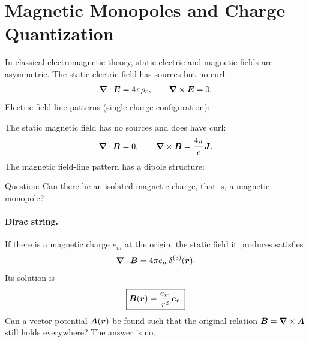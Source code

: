 \section{Magnetic Monopoles and Charge Quantization}
In classical electromagnetic theory, static electric and magnetic fields are asymmetric. The static electric field has sources but no curl:
\begin{equation}
\bm{\nabla}\cdot\bm{E}=4\pi\rho_e,\qquad
\bm{\nabla}\times\bm{E}=0.
\end{equation}
Electric field-line patterns (single-charge configuration):
\begin{center}\end{center}
The static magnetic field has no sources and does have curl:
\begin{equation}
\bm{\nabla}\cdot\bm{B}=0,\qquad
\bm{\nabla}\times\bm{B}=\frac{4\pi}{c}\bm{J}.
\end{equation}
The magnetic field-line pattern has a dipole structure:
\begin{center}\end{center}
Question: Can there be an isolated magnetic charge, that is, a magnetic monopole?

\paragraph{Dirac string.}
If there is a magnetic charge $e_m$ at the origin, the static field it produces satisfies
\begin{equation}
\bm{\nabla}\cdot\bm{B}=4\pi e_m\delta^{(3)}(\bm{r}).
\end{equation}
Its solution is
\begin{equation}
\boxed{\bm{B}(\bm{r})=\frac{e_m}{r^2}\bm{e}_r.}
\end{equation}
Can a vector potential $\bm{A}(\bm{r})$ be found such that the original relation $\bm{B}=\bm{\nabla}\times\bm{A}$ still holds everywhere? The answer is no.

